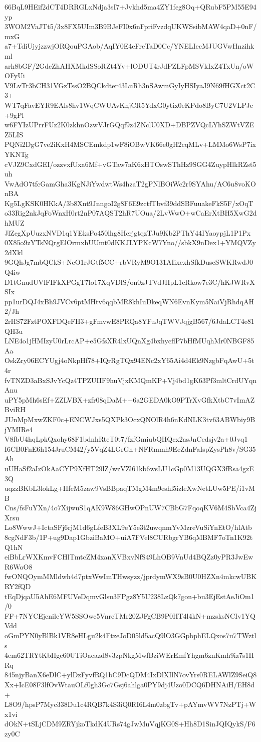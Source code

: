 66BqL9HEif2dCT4DRRGLxNdja3sI7+Jvkhd5ma4ZY1feg8Oq+QRubF5PM55E94yp
3WOM2VaJTt5/3x8FX5UIm3B9BJeFI0x6nFpriFvzdqUKWSsibMAW4qaD+0nF/mxG
a7+TdiUjyjzzwjORQouPGAob/AqIY0E4eFreTaD0Cc/YNELIecMJUGVwHnzihkml
arh8bGF/2GdcZhAHXMkdSSoRZt4Yv+lODUT4rJdPZLFpMSVkIxZ4TxUn/oWOFyUi
V9LvTr3bCH31VGzTssO2BQCkdter43LuRh3nSAwmGyIyHSIyaJ9N69fHGXct2C3+
WT7qFavEYR9EAls8hv1WqCWUAvKnjCR5YdxG0ytix0eKPdo8ByC7U2VLPJc+9gPl
w6FYIzUPrrFUz2K0zkhnOzwVJrGQqf9z4ZNclU0XD+DBPZVQcLYhSZWtVZEZ5LIS
PQNi2DgG7ve2iKxH4MSCEmkdp1wF8iOBwVK66e0gH2cqMLv+LMMo6WsP7ixYKNTg
cVJZ9CxdGEI/ozzvxfUxa6Mf+vGTaw7aK6xHTOswSThHz9SGG4ZuypHlkRZst5uh
VwAdO7tfcGamGha3KgNJiYwdwtWs4hzaT2gPNlBOiWc2r9SYAhu/AC6u8voKOnBA
Kg5LgKSK0HKkA/3b8Xnt9JnngoI2g8F6E9zctfTbvf39ddSBFuuakeFkS5F/xOqT
o33Rig2nkJqFoWnxH0rt2nP07AQST2hR7UOua/2LvWwO+wCaErXtBH5XwG2dhMUZ
JlZcgXpUuzxNVD1q1YEksPo450lhg8HcrjgtqzTJu9Kb2PThY44IYaoypjL1P1Px
0X85o9zYTsNQrgElOrmxhUUmt0dKKJLYPKcW7Yno//sbkX9nDex1+YMQVZy2dXkl
9GQhJg7mbQCkS+NeO1rJGtf5CC+rbVRyM9O131AIixexhSfkDuseSWKRwdJ0Q4iw
D1tGnudUVlFIFkXPGgT7lo17XqVDlS/on0zJTVdJHpL1cRkow7c3C/hKJWRvXSIx
pp1urDQJ4xBh9JVCv6ptMHtv6qqbMR8khIuDkeqWN6EvnKym5NaiVjRhdqAH2/Jh
2rHS72FztPOXFDQeFH3+gFmvwE8PRQa8YFuJqTWVJqjgB567/6JdaLCT4e81QH3u
LNE4o1jHMIzyU0rLrcAP+e5GfsXR4lxUQnXg4bxhycflP7bHfMUqhMr0NBGF85Aa
OskZry06ECYUgj4oNkpHf78+IQrRgTQx94ENc2xY65Ai4d4Ek9NzgbFqAwU+5t4r
fvTNZD3aBxSJvYcQz4TPZUIIF9huVjxKMQmKP+Vj4bd1gK63Pf3mltCrdUYqnAnu
uPY5pMh6sEf+ZZLVBX+zfr08qDaM++6a2GEDA0kO9PTrXvGfkXtbC7vImAZBviRH
JUnMpMxwZKF0c+ENCWJxs5QXPk3OcxQNOlR4h6nKdNLK3tv63ABWbiy9BjYMIRe4
V8fbU4hqLpkQxohy68F1bdnhRteT0t7/fzfGmiubQHQcx2asJnCedsjv2a+0Jvq1
I6CB0FnE6h154JruCM42/y5VqZ4LGrGn+NFRmmh9EeZdnFaIspZysPh8v/SG35Ah
uUHaSf2aIzOkAaCYP9XfHT29lZ/wzVZl61kb6wsLU1cGp0M13UQGX3fRsa4gzE3Q
uqzzBKbL3lokLg+HfeM5zaw9VsBBpaqTMgM4m9eshl5izleXwNetLUw5PE/i1vMB
Cns/fsFuYXn/4o7XijwuS1qAK9W86GHwOPnUW7CBbG7FqoqKV6M4SbVca4ZjXrsu
Lo8WwwJ+IctaSFj6rjM1d6gLfeB3XL9eY5e3t2uwqnmYvMzreVuSiYnEtO/hlAtb
8cgNdF3b/1P+ug9Dap1GbziBaMO+uiA7FVel8CURbgrYB6qMBMF7oTn1K92tQ1hN
eiBbLrWXKmvFCHlTmtcZM4xanXVBxvNfS49LhOB9VnUd4BQZz0yPR3JwEwR6WoO8
fwONQOymMMldwh4d7ptxWwImTHwsyzz/jprdymWX9sB0U0HZXn4mkcwUBKRY2fQD
tEqDjqaU5AhE6MFUVeDqmvGlsu3FPgz8Y5U238LzQk7gon+bu3EjEstAeJiOm1/0
FF+7NYCEjcnileYW5SSOwc5VnreTMr20ZJFgCB9P0HT4l4kN+mzsksNCIv1YQVdd
oGmPYN0yBlBk1VR8eHLgu2k4FtzeJoD05ld5acQ9lO3GGpbphELQxos7u7TWztls
4em62TRYtKbHgc60UTiOaeazd8v3zpNkgMwfBziWErEmfYhgm6znKmh9iz7s1HRq
845njyBanX6eDlC+ylDzFyvfRQ1bC9DcQDM4IxDlXIlN7ovYrs0RELAWlZ9SeiQ8
Xx+IcE08F3lfOvWtauOLf0gh3Gc7Gsj6ahlga0PY9dj4Uzo0DCQ6DHNAiH/EH8d+
L8O9/hpsP7Myc338Du1c4RQB7k4S3iQ0RI6L4m0zbgTv+pAYmvWV7NzPTj+Wx1vi
dOkN+tSLjCDM9ZRYjkoTkdK4URs74gJwMuVqjKG0S+Hh8D1SinJQIQykS/F6zy0C
